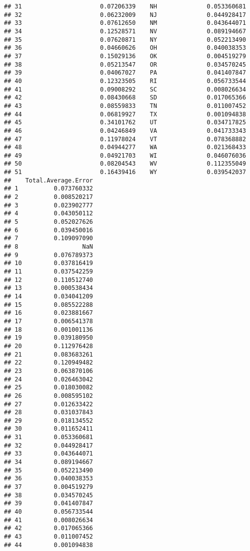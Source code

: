 \documentclass{article}\usepackage[]{graphicx}\usepackage[]{color}
\makeatletter
\newenvironment{kframe}{%
 \def\at@end@of@kframe{}%
 \ifinner\ifhmode%
  \def\at@end@of@kframe{\end{minipage}}%
  \begin{minipage}{\columnwidth}%
 \fi\fi%
 \def\FrameCommand##1{\hskip\@totalleftmargin \hskip-\fboxsep
 \colorbox{shadecolor}{##1}\hskip-\fboxsep
     \hskip-\linewidth \hskip-\@totalleftmargin \hskip\columnwidth}%
 \MakeFramed {\advance\hsize-\width
   \@totalleftmargin\z@ \linewidth\hsize
   \@setminipage}}%
 {\par\unskip\endMakeFramed%
 \at@end@of@kframe}
\newenvironment{knitrout}{}{} %
\makeatother
\begin{document}
\begin{knitrout}
\begin{kframe}
\begin{verbatim}
## 31                      0.07206339    NH              0.053360681
## 32                      0.06232009    NJ              0.044928417
## 33                      0.07612650    NM              0.043644071
## 34                      0.12528571    NV              0.089194667
## 35                      0.07620871    NY              0.052213490
## 36                      0.04660626    OH              0.040038353
## 37                      0.15029136    OK              0.004519279
## 38                      0.05213547    OR              0.034570245
## 39                      0.04067027    PA              0.041407847
## 40                      0.12323505    RI              0.056733544
## 41                      0.09008292    SC              0.008026634
## 42                      0.08430668    SD              0.017065366
## 43                      0.08559833    TN              0.011007452
## 44                      0.06819927    TX              0.001094838
## 45                      0.34101762    UT              0.034717825
## 46                      0.04246849    VA              0.041733343
## 47                      0.11978024    VT              0.078368882
## 48                      0.04944277    WA              0.021368433
## 49                      0.04921703    WI              0.046076036
## 50                      0.08204543    WV              0.112355049
## 51                      0.16439416    WY              0.039542037
##    Total.Average.Error
## 1          0.073760332
## 2          0.008520217
## 3          0.023902777
## 4          0.043050112
## 5          0.052027626
## 6          0.039450016
## 7          0.109097090
## 8                  NaN
## 9          0.076789373
## 10         0.037816419
## 11         0.037542259
## 12         0.110512740
## 13         0.000538434
## 14         0.034041209
## 15         0.085522288
## 16         0.023881667
## 17         0.006541378
## 18         0.001001136
## 19         0.039180950
## 20         0.112976428
## 21         0.083683261
## 22         0.120949482
## 23         0.063870106
## 24         0.026463042
## 25         0.018030082
## 26         0.008595102
## 27         0.012633422
## 28         0.031037843
## 29         0.018134552
## 30         0.011652411
## 31         0.053360681
## 32         0.044928417
## 33         0.043644071
## 34         0.089194667
## 35         0.052213490
## 36         0.040038353
## 37         0.004519279
## 38         0.034570245
## 39         0.041407847
## 40         0.056733544
## 41         0.008026634
## 42         0.017065366
## 43         0.011007452
## 44         0.001094838

\end{verbatim}
\end{kframe}
\end{knitrout}
\end{document}
